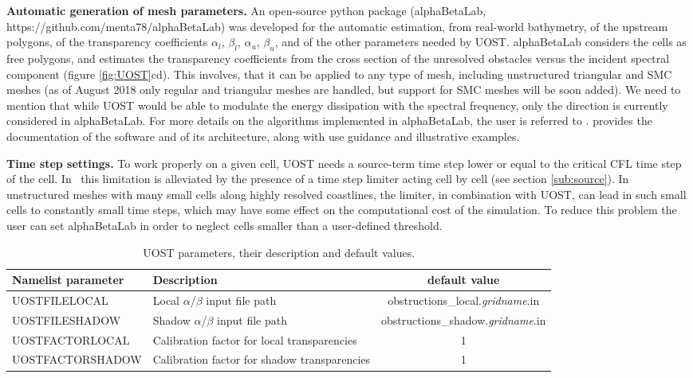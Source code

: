 \textbf{Automatic generation of mesh parameters.} 
An open-source python package (alphaBetaLab, https://github.com/menta78/alphaBetaLab) 
was developed
for the automatic estimation, from real-world bathymetry, of the upstream polygons, 
of the transparency coefficients
$\alpha_l$, $\beta_l$, $\alpha_u$, $\beta_u$,
and of the other parameters needed by UOST.
alphaBetaLab considers the cells as free polygons, and estimates the transparency coefficients
from the cross section of the unresolved obstacles versus the incident spectral component 
(figure \ref{fig:UOST}cd).
This involves, that it can be applied to any type of mesh, 
including unstructured triangular and SMC meshes 
(as of August 2018 only regular and triangular meshes are handled, 
but support for SMC meshes 
will be soon added). 
We need to mention that while UOST would be able to modulate the energy dissipation 
with the spectral frequency, only the direction is currently considered in alphaBetaLab.
For more details on the algorithms implemented in alphaBetaLab, 
the user is referred to \cite{art:Mentaschi2018a}. 
\cite{art:Mentaschi2018c} provides the documentation of the software and of its architecture,
along with use guidance and illustrative examples. 

\textbf{Time step settings.} To work properly on a given cell, 
UOST needs a source-term time step lower
or equal to the critical CFL time step of the cell.
In \ws\
this limitation is alleviated by the presence of a time step limiter
acting cell by cell
(see section \ref{sub:source}).
In unstructured meshes with many small cells along highly resolved coastlines,
the limiter, in combination with UOST, can lead 
in such small cells to constantly small time steps, which may have some effect on the 
computational cost of the simulation.
To reduce this problem the user can set alphaBetaLab in order to
neglect cells smaller than a user-defined threshold.


\begin{table} \begin{center}
\begin{tabular}{|l|p{4cm}|c|} \hline \hline
Namelist parameter    &  Description           & default value \\
\hline
  UOSTFILELOCAL &  Local $\alpha$/$\beta$ input file path   &  obstructions\_local.\textit{gridname}.in    \\ \hline
  UOSTFILESHADOW &  Shadow $\alpha$/$\beta$ input file path   & obstructions\_shadow.\textit{gridname}.in   \\ \hline
  UOSTFACTORLOCAL &  Calibration factor for local transparencies  &  1   \\ \hline
  UOSTFACTORSHADOW &  Calibration factor for shadow transparencies  &  1  \\
\hline
\end{tabular} \end{center}
\caption{UOST parameters, their description and default values. } \label{tab:UOST}
\botline
\end{table}

